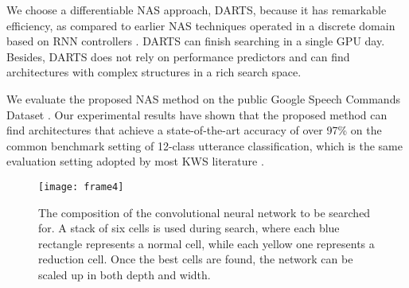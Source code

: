 \documentclass[a4paper]{article}
\begin{document}
We choose a differentiable NAS approach, DARTS, because it has remarkable efficiency, as compared to earlier NAS techniques operated in a discrete domain based on RNN controllers \cite{zoph2016neural,zoph2018learning}. DARTS can finish searching in a single GPU day.  
Besides, DARTS does not rely on performance predictors \cite{liu2018progressive} and can find architectures with complex structures in a rich search space. 


We evaluate the proposed NAS method on the public Google Speech Commands Dataset \cite{warden2018speech}. 
Our experimental results have shown that the proposed method can find architectures that achieve a state-of-the-art accuracy of over 97\% on the common benchmark setting of 12-class utterance classification, which is the same evaluation setting adopted by most KWS literature \cite{tang2017honk, tang2018deep, choi2019temporal,chen2019small,mittermaier2019small,veniat2019stochastic}.




 








\begin{figure}[t]
    \centering
    \texttt{[image: frame4]}
    \vspace{-6.5mm}
    \caption{The composition of the convolutional neural network to be searched for. A stack of six cells is used during search, where each blue rectangle represents a normal cell, while each yellow one represents a reduction cell. Once the best cells are found, the network can be scaled up in both depth and width.}
    \label{fig:network}
\end{figure}
\end{document}
